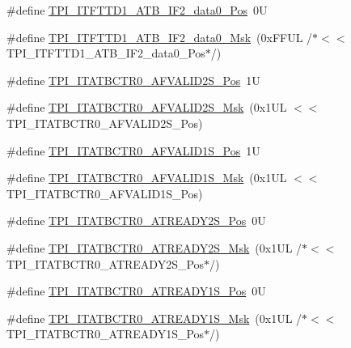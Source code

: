 \begin{DoxyCompactItemize}
\item 
\#define \mbox{\hyperlink{group___c_m_s_i_s___t_p_i_gaaa0d7dc480efe4e717e2ab84643ae6e0}{T\+P\+I\+\_\+\+I\+T\+F\+T\+T\+D1\+\_\+\+A\+T\+B\+\_\+\+I\+F2\+\_\+data0\+\_\+\+Pos}}~0U
\item 
\#define \mbox{\hyperlink{group___c_m_s_i_s___t_p_i_gaf688adf6b3790de906b3f50bc89eaaed}{T\+P\+I\+\_\+\+I\+T\+F\+T\+T\+D1\+\_\+\+A\+T\+B\+\_\+\+I\+F2\+\_\+data0\+\_\+\+Msk}}~(0x\+F\+F\+U\+L /$\ast$$<$$<$ T\+P\+I\+\_\+\+I\+T\+F\+T\+T\+D1\+\_\+\+A\+T\+B\+\_\+\+I\+F2\+\_\+data0\+\_\+\+Pos$\ast$/)
\item 
\#define \mbox{\hyperlink{group___c_m_s_i_s___t_p_i_ga1ca17a69fe70e2cb87f04a2160bca51a}{T\+P\+I\+\_\+\+I\+T\+A\+T\+B\+C\+T\+R0\+\_\+\+A\+F\+V\+A\+L\+I\+D2\+S\+\_\+\+Pos}}~1U
\item 
\#define \mbox{\hyperlink{group___c_m_s_i_s___t_p_i_ga8d47192a54ef5a7e9086d4c949f33b24}{T\+P\+I\+\_\+\+I\+T\+A\+T\+B\+C\+T\+R0\+\_\+\+A\+F\+V\+A\+L\+I\+D2\+S\+\_\+\+Msk}}~(0x1\+U\+L $<$$<$ T\+P\+I\+\_\+\+I\+T\+A\+T\+B\+C\+T\+R0\+\_\+\+A\+F\+V\+A\+L\+I\+D2\+S\+\_\+\+Pos)
\item 
\#define \mbox{\hyperlink{group___c_m_s_i_s___t_p_i_gac2018f988c8306301a11a8f08af67d2c}{T\+P\+I\+\_\+\+I\+T\+A\+T\+B\+C\+T\+R0\+\_\+\+A\+F\+V\+A\+L\+I\+D1\+S\+\_\+\+Pos}}~1U
\item 
\#define \mbox{\hyperlink{group___c_m_s_i_s___t_p_i_ga8ea98aa5bb5a223e409213ef9a754cbd}{T\+P\+I\+\_\+\+I\+T\+A\+T\+B\+C\+T\+R0\+\_\+\+A\+F\+V\+A\+L\+I\+D1\+S\+\_\+\+Msk}}~(0x1\+U\+L $<$$<$ T\+P\+I\+\_\+\+I\+T\+A\+T\+B\+C\+T\+R0\+\_\+\+A\+F\+V\+A\+L\+I\+D1\+S\+\_\+\+Pos)
\item 
\#define \mbox{\hyperlink{group___c_m_s_i_s___t_p_i_ga0ca42c4782e0a5421c34b14a0183c220}{T\+P\+I\+\_\+\+I\+T\+A\+T\+B\+C\+T\+R0\+\_\+\+A\+T\+R\+E\+A\+D\+Y2\+S\+\_\+\+Pos}}~0U
\item 
\#define \mbox{\hyperlink{group___c_m_s_i_s___t_p_i_ga07713088c6abb2ab14efa3a0e0b9e454}{T\+P\+I\+\_\+\+I\+T\+A\+T\+B\+C\+T\+R0\+\_\+\+A\+T\+R\+E\+A\+D\+Y2\+S\+\_\+\+Msk}}~(0x1\+U\+L /$\ast$$<$$<$ T\+P\+I\+\_\+\+I\+T\+A\+T\+B\+C\+T\+R0\+\_\+\+A\+T\+R\+E\+A\+D\+Y2\+S\+\_\+\+Pos$\ast$/)
\item 
\#define \mbox{\hyperlink{group___c_m_s_i_s___t_p_i_ga616d6fbe0522ce0c5ad1711d33509907}{T\+P\+I\+\_\+\+I\+T\+A\+T\+B\+C\+T\+R0\+\_\+\+A\+T\+R\+E\+A\+D\+Y1\+S\+\_\+\+Pos}}~0U
\item 
\#define \mbox{\hyperlink{group___c_m_s_i_s___t_p_i_ga6211d550c37ce45f9593ddf98d71f6eb}{T\+P\+I\+\_\+\+I\+T\+A\+T\+B\+C\+T\+R0\+\_\+\+A\+T\+R\+E\+A\+D\+Y1\+S\+\_\+\+Msk}}~(0x1\+U\+L /$\ast$$<$$<$ T\+P\+I\+\_\+\+I\+T\+A\+T\+B\+C\+T\+R0\+\_\+\+A\+T\+R\+E\+A\+D\+Y1\+S\+\_\+\+Pos$\ast$/)

\end{DoxyCompactItemize}
